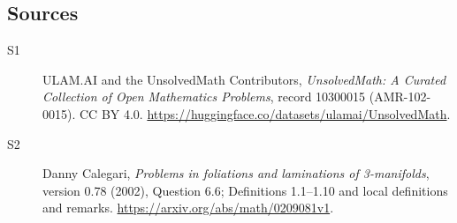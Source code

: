 \documentclass[11pt]{article}
\begin{document}
\subsection{Sources}
\begin{description}
\item[\hypertarget{source:10300015:1}{S1}] ULAM.AI and the UnsolvedMath Contributors, \emph{UnsolvedMath: A Curated Collection of Open Mathematics Problems}, record 10300015 (AMR-102-0015). CC BY 4.0. \url{https://huggingface.co/datasets/ulamai/UnsolvedMath}.
\item[\hypertarget{source:10300015:2}{S2}] Danny Calegari, \emph{Problems in foliations and laminations of 3-manifolds}, version 0.78 (2002), Question 6.6; Definitions 1.1--1.10 and local definitions and remarks. \url{https://arxiv.org/abs/math/0209081v1}.
\end{description}
\label{end:10300015}
\end{document}
